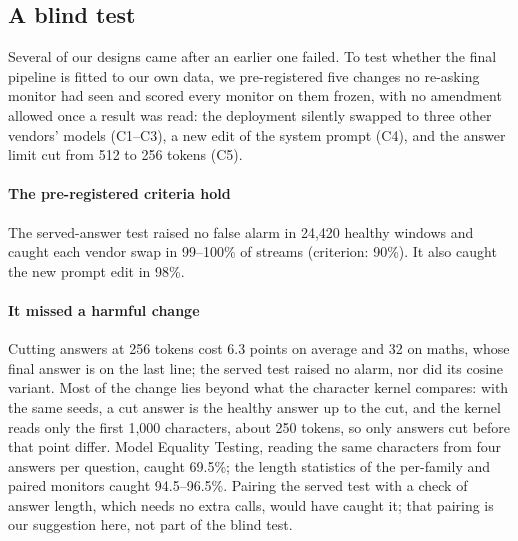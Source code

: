 \documentclass{article}
\begin{document}
\subsection{A blind test}
\label{sec:blind}

Several of our designs came after an earlier one failed. To test whether the final
pipeline is fitted to our own data, we pre-registered five changes no re-asking
monitor had seen and scored every monitor on them frozen, with no amendment allowed
once a result was read: the deployment silently swapped to three other vendors'
models (C1--C3), a new edit of the system prompt (C4), and the answer limit cut from
512 to 256 tokens (C5).

\begin{center}\small
\setlength{\tabcolsep}{3.5pt}
\end{center}

\paragraph{The pre-registered criteria hold} The served-answer test raised no false
alarm in 24{,}420 healthy windows and caught each vendor swap in 99--100\% of
streams (criterion: 90\%). It also caught the new prompt edit in 98\%.

\paragraph{It missed a harmful change} Cutting answers at 256 tokens cost 6.3 points
on average and 32 on maths, whose final answer is on the last line; the served test
raised no alarm, nor did its cosine variant. Most of the change lies beyond what
the character kernel compares: with the same seeds, a cut answer is the healthy
answer up to the cut, and the kernel reads only the first 1{,}000 characters, about
250 tokens, so only answers cut before that point differ. Model Equality Testing,
reading the same characters from four answers per question, caught 69.5\%; the
length statistics of the per-family and paired monitors caught 94.5--96.5\%. Pairing the served test with a check of answer length,
which needs no extra calls, would have caught it; that pairing is our suggestion
here, not part of the blind test.
\end{document}
